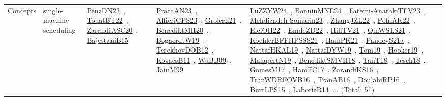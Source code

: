 {\begin{longtable}{lp{3cm}>{\raggedright\arraybackslash}p{6cm}>{\raggedright\arraybackslash}p{6cm}>{\raggedright\arraybackslash}p{8cm}}
\index{single-machine scheduling}\index{Concepts!single-machine scheduling}Concepts & single-machine scheduling & \href{../works/PenzDN23.pdf}{PenzDN23}~\cite{PenzDN23}, \href{../works/TouatBT22.pdf}{TouatBT22}~\cite{TouatBT22}, \href{../works/ZarandiASC20.pdf}{ZarandiASC20}~\cite{ZarandiASC20}, \href{../works/BajestaniB15.pdf}{BajestaniB15}~\cite{BajestaniB15} & \href{../works/PrataAN23.pdf}{PrataAN23}~\cite{PrataAN23}, \href{../works/AlfieriGPS23.pdf}{AlfieriGPS23}~\cite{AlfieriGPS23}, \href{../works/Groleaz21.pdf}{Groleaz21}~\cite{Groleaz21}, \href{../works/BenediktMH20.pdf}{BenediktMH20}~\cite{BenediktMH20}, \href{../works/BogaerdtW19.pdf}{BogaerdtW19}~\cite{BogaerdtW19}, \href{../works/TerekhovDOB12.pdf}{TerekhovDOB12}~\cite{TerekhovDOB12}, \href{../works/KovacsB11.pdf}{KovacsB11}~\cite{KovacsB11}, \href{../works/WuBB09.pdf}{WuBB09}~\cite{WuBB09}, \href{../works/JainM99.pdf}{JainM99}~\cite{JainM99} & \href{../works/LuZZYW24.pdf}{LuZZYW24}~\cite{LuZZYW24}, \href{../works/BonninMNE24.pdf}{BonninMNE24}~\cite{BonninMNE24}, \href{../works/Fatemi-AnarakiTFV23.pdf}{Fatemi-AnarakiTFV23}~\cite{Fatemi-AnarakiTFV23}, \href{../works/Mehdizadeh-Somarin23.pdf}{Mehdizadeh-Somarin23}~\cite{Mehdizadeh-Somarin23}, \href{../works/ZhangJZL22.pdf}{ZhangJZL22}~\cite{ZhangJZL22}, \href{../works/PohlAK22.pdf}{PohlAK22}~\cite{PohlAK22}, \href{../works/ElciOH22.pdf}{ElciOH22}~\cite{ElciOH22}, \href{../works/EmdeZD22.pdf}{EmdeZD22}~\cite{EmdeZD22}, \href{../works/HillTV21.pdf}{HillTV21}~\cite{HillTV21}, \href{../works/QinWSLS21.pdf}{QinWSLS21}~\cite{QinWSLS21}, \href{../works/KoehlerBFFHPSSS21.pdf}{KoehlerBFFHPSSS21}~\cite{KoehlerBFFHPSSS21}, \href{../works/HamPK21.pdf}{HamPK21}~\cite{HamPK21}, \href{../works/PandeyS21a.pdf}{PandeyS21a}~\cite{PandeyS21a}, \href{../works/NattafHKAL19.pdf}{NattafHKAL19}~\cite{NattafHKAL19}, \href{../works/NattafDYW19.pdf}{NattafDYW19}~\cite{NattafDYW19}, \href{../works/Tom19.pdf}{Tom19}~\cite{Tom19}, \href{../works/Hooker19.pdf}{Hooker19}~\cite{Hooker19}, \href{../works/MalapertN19.pdf}{MalapertN19}~\cite{MalapertN19}, \href{../works/BenediktSMVH18.pdf}{BenediktSMVH18}~\cite{BenediktSMVH18}, \href{../works/TanT18.pdf}{TanT18}~\cite{TanT18}, \href{../works/Tesch18.pdf}{Tesch18}~\cite{Tesch18}, \href{../works/GomesM17.pdf}{GomesM17}~\cite{GomesM17}, \href{../works/HamFC17.pdf}{HamFC17}~\cite{HamFC17}, \href{../works/ZarandiKS16.pdf}{ZarandiKS16}~\cite{ZarandiKS16}, \href{../works/TranWDRFOVB16.pdf}{TranWDRFOVB16}~\cite{TranWDRFOVB16}, \href{../works/TranAB16.pdf}{TranAB16}~\cite{TranAB16}, \href{../works/DoulabiRP16.pdf}{DoulabiRP16}~\cite{DoulabiRP16}, \href{../works/BurtLPS15.pdf}{BurtLPS15}~\cite{BurtLPS15}, \href{../works/LaborieR14.pdf}{LaborieR14}~\cite{LaborieR14}... (Total: 51)\\

\end{longtable}}
